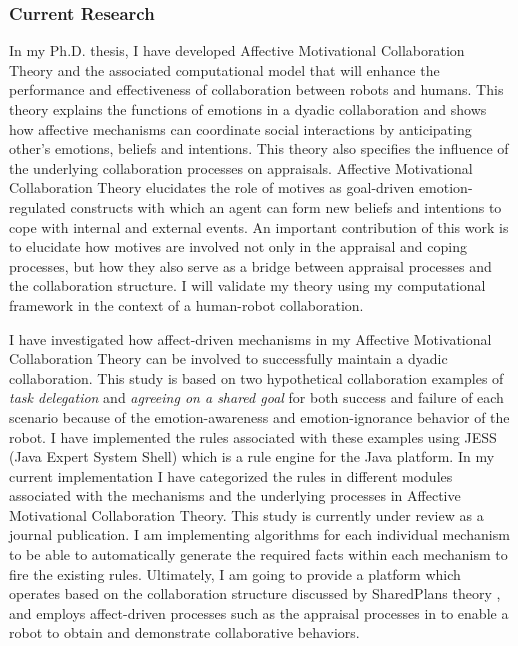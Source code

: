 \documentclass[a4paper, 10pt]{article}
\begin{document}
\begin{small}
\subsubsection*{Current Research}

In my Ph.D. thesis, I have developed Affective Motivational Collaboration Theory
and the associated computational model that will enhance the performance and
effectiveness of collaboration between robots and humans. This theory explains
the functions of emotions in a dyadic collaboration and shows how affective
mechanisms can coordinate social interactions by anticipating other's emotions,
beliefs and intentions. This theory also specifies the influence of the
underlying collaboration processes on appraisals. Affective Motivational
Collaboration Theory elucidates the role of motives as goal-driven
emotion-regulated constructs with which an agent can form new beliefs and
intentions to cope with internal and external events. An important contribution
of this work is to elucidate how motives are involved not only in the appraisal
and coping processes, but how they also serve as a bridge between appraisal
processes and the collaboration structure. I will validate my theory using my
computational framework in the context of a human-robot collaboration.

I have investigated how affect-driven mechanisms in my Affective Motivational
Collaboration Theory can be involved to successfully maintain a dyadic
collaboration. This study is based on two hypothetical collaboration examples of
\textit{task delegation} and \textit{agreeing on a shared goal} for both
success and failure of each scenario because of the emotion-awareness and
emotion-ignorance behavior of the robot. I have implemented the rules associated
with these examples using JESS (Java Expert System Shell) which is a rule engine
for the Java platform. In my current implementation I have categorized the
rules in different modules associated with the mechanisms and the underlying
processes in Affective Motivational Collaboration Theory. This study is
currently under review as a journal publication. I am implementing algorithms
for each individual mechanism to be able to automatically generate the required
facts within each mechanism to fire the existing rules. Ultimately, I am going
to provide a platform which operates based on the collaboration structure
discussed by SharedPlans theory \cite{grosz:discourse-structure}, and employs
affect-driven processes such as the appraisal processes in
\cite{marsella:ema-process-model} to enable a robot to obtain and demonstrate
collaborative behaviors.


\end{small}
\end{document}

